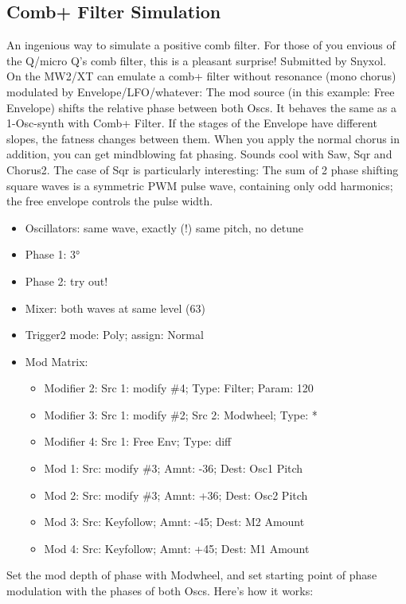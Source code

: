 \subsection{Comb+ Filter Simulation}
An ingenious way to simulate a positive comb filter. For those of you envious of the Q/micro Q's comb filter, this is a pleasant surprise! Submitted by Snyxol.\\
On the MW2/XT can emulate a comb+ filter without resonance (mono chorus) modulated by Envelope/LFO/whatever:
The mod source (in this example: Free Envelope) shifts the relative phase between both Oscs. It behaves the same as a 1-Osc-synth with Comb+ Filter.
If the stages of the Envelope have different slopes, the fatness changes between them. When you apply the normal chorus in addition, you can get mindblowing fat phasing. Sounds cool with Saw, Sqr and Chorus2.
The case of Sqr is particularly interesting: The sum of 2 phase shifting square waves is a symmetric PWM pulse wave, containing only odd harmonics; the free envelope controls the pulse width.
\begin{itemize}
	\item Oscillators: same wave, exactly (!) same pitch, no detune
	\item Phase 1: 3°
	\item Phase 2: try out!
	\item Mixer: both waves at same level (63)
	\item Trigger2 mode: Poly; assign: Normal
	\item Mod Matrix:
	\begin{itemize}
		\item Modifier 2: Src 1: modify \#4; Type: Filter; Param: 120
		\item Modifier 3: Src 1: modify \#2; Src 2: Modwheel; Type: *
		\item Modifier 4: Src 1: Free Env; Type: diff
		\item Mod 1: Src: modify \#3; Amnt: -36; Dest: Osc1 Pitch
		\item Mod 2: Src: modify \#3; Amnt: +36; Dest: Osc2 Pitch
		\item Mod 3: Src: Keyfollow; Amnt: -45; Dest: M2 Amount
		\item Mod 4: Src: Keyfollow; Amnt: +45; Dest: M1 Amount
	\end{itemize}
\end{itemize}
Set the mod depth of phase with Modwheel, and set starting point of phase modulation with the phases of both Oscs. Here's how it works:

